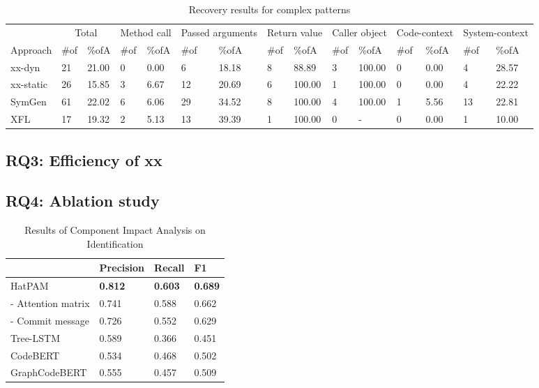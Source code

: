 \documentclass[acmsmall,screen,review,anonymous]{acmart} %
\begin{document}
\renewcommand\arraystretch{1.15}
\begin{table}
  \centering
  \footnotesize
\caption{Recovery results for complex patterns}\label{tab:dy2}
\begin{tabular}{p{1cm}p{.3cm}p{.7cm}p{.3cm}p{.7cm}p{.6cm}p{1cm}p{.4cm}p{.7cm}p{.4cm}p{.7cm}p{.4cm}p{.7cm}p{.5cm}p{.5cm}}
\toprule
& \multicolumn{2}{c}{Total} & \multicolumn{2}{c}{Method call} & \multicolumn{2}{c}{Passed arguments} & \multicolumn{2}{c}{Return value} & \multicolumn{2}{c}{Caller object}&\multicolumn{2}{c}{Code-context}&\multicolumn{2}{c}{System-context}\\
Approach & \#of & \%ofA & \#of & \%ofA & \#of & \%ofA & \#of & \%ofA & \#of & \%ofA & \#of & \%ofA & \#of & \%ofA\\
\midrule
xx-dyn & 21  & 21.00 & 0  &0.00 &6 &18.18 & 8 &88.89 &3 &100.00 &0 &0.00 &4 &28.57  \\
xx-static& 26 & 15.85 & 3 &6.67 & 12 & 20.69 &6 &100.00 &1 &100.00 &0 &0.00 &4 &22.22 \\
SymGen&61   & 22.02& 6 &6.06  & 29 &34.52 &8 &100.00 &4 &100.00 &1 &5.56 &13 &22.81 \\
XFL& 17  & 19.32 & 2 & 5.13 & 13 & 39.39 &1 &100.00 &0 &\mbox{-} &0 &0.00 &1 &10.00  \\
\bottomrule
\end{tabular}
\end{table}
\renewcommand\arraystretch{1.0}

\subsection{RQ3: Efficiency of xx}
\subsection{RQ4: Ablation study}

\begin{table}
  \centering
  \scriptsize
  \caption{Results of Component Impact Analysis on Identification}
  \renewcommand\arraystretch{1.31}
    \begin{tabular}{p{3cm}p{1.5cm}p{1.5cm}p{1cm}}
    \toprule
     &  \textbf{Precision} & \textbf{Recall} & \textbf{F1} \\
    \hline
    HatPAM & \textbf{0.812} & \textbf{0.603} & \textbf{0.689}\\
    - Attention matrix & 0.741 & 0.588 & 0.662 \\
    - Commit message  & 0.726 & 0.552 & 0.629 \\
    \hline
    Tree-LSTM & 0.589 & 0.366 & 0.451 \\ \hline
    CodeBERT & 0.534 & 0.468 & 0.502 \\ \hline
    GraphCodeBERT & 0.555 & 0.457 & 0.509 \\ 
    \hline
    \end{tabular}%
\end{table}%
\renewcommand\arraystretch{1.0}
\end{document}
